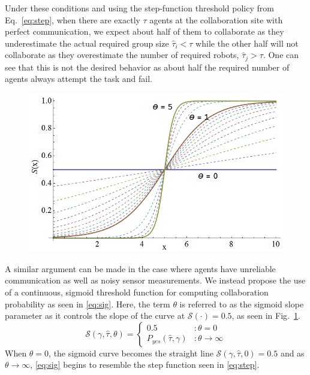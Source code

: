 \documentclass[conference]{ieeeconf}
\def\estt{\hat{\tau}}
\def\estg{\gamma}
\newcommand{\sig}{\mathcal{S}}
\begin{document}
Under these conditions and using the step-function threshold policy from Eq.~\ref{eq:step}, when there are exactly $\tau$ agents at the collaboration site with perfect communication, we expect about half of them to collaborate as they underestimate the actual required group size $\estt_i < \tau$ while the other half will not collaborate as they overestimate the number of required robots, $\estt_j > \tau$. One can see that this is not the desired behavior as about half the required number of agents always attempt the task and fail.

\begin{figure}[!ht]
\centering\includegraphics[width=\columnwidth]{../figures/sigmoid1.png}
\centering\caption{}\label{fig:sigmoid}
\end{figure}

A similar argument can be made in the case where agents have unreliable communication as well as noisy sensor measurements. We instead propose the use of a continuous, sigmoid threshold function for computing collaboration probability as seen in \eqref{eq:sig}. Here, the term $\theta$ is referred to as the sigmoid slope parameter as it controls the slope of the curve at $\sig(\cdot) = 0.5$, as seen in Fig.~\ref{fig:sigmoid}. 
\begin{equation}
	\sig(\estg, \estt, \theta) =  \left\{
	\begin{array}{ll}
		0.5 & : \theta = 0\\ 
		P_{yes}(\estt,\estg) & : \theta \to \infty
	\end{array}\right.
\end{equation}
When $\theta = 0$, the sigmoid curve becomes the straight line $\sig(\estg, \estt, 0) = 0.5$ and as $\theta \to \infty$, \eqref{eq:sig} begins to resemble the step function seen in \eqref{eq:step}.
\end{document}
